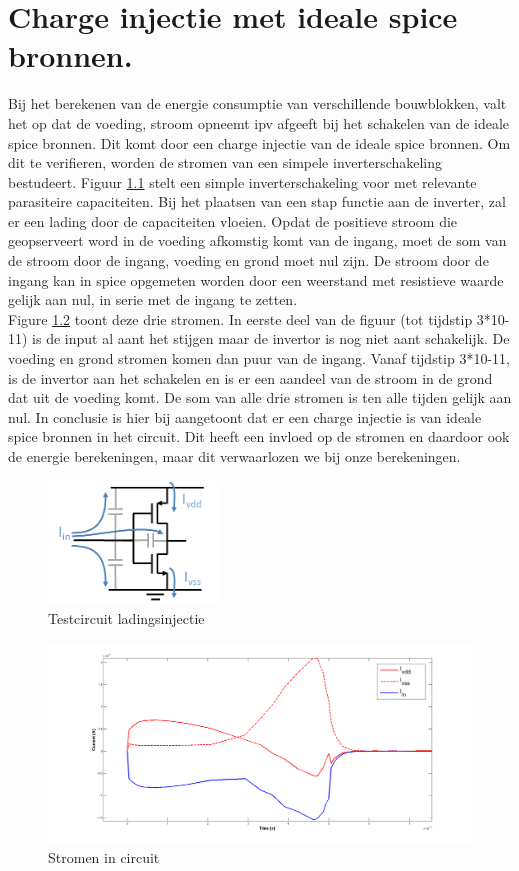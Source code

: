 \chapter{Charge injectie met ideale spice bronnen.}
\label{app:chargeinj}
Bij het berekenen van de energie consumptie van verschillende bouwblokken, valt het op dat de voeding, stroom opneemt ipv afgeeft bij het schakelen van de ideale spice bronnen. Dit komt door een charge injectie van de ideale spice bronnen. Om dit te verifieren, worden de stromen van een simpele inverterschakeling bestudeert. Figuur \ref{fig:chargeinj_inv} stelt een simple inverterschakeling voor met relevante parasiteire capaciteiten. Bij het plaatsen van een stap functie aan de inverter, zal er een lading door de capaciteiten vloeien. Opdat de positieve stroom die geopserveert word in de voeding afkomstig komt van de ingang, moet de som van de stroom door de ingang, voeding en grond moet nul zijn. De stroom door de ingang kan in spice opgemeten worden door een weerstand met resistieve waarde gelijk aan nul, in serie met de ingang te zetten.\\
Figure \ref{fig:chargeinj_cur} toont deze drie stromen. In eerste deel van de figuur (tot tijdstip 3*10-11) is de input al aant het stijgen maar de invertor is nog niet aant schakelijk. De voeding en grond stromen komen dan puur van de ingang. Vanaf tijdstip 3*10-11, is de invertor aan het schakelen en is er een aandeel van de stroom in de grond dat uit de voeding komt. De som van alle drie stromen is ten alle tijden gelijk aan nul.
In conclusie is hier bij aangetoont dat er een charge injectie is van ideale spice bronnen in het circuit. Dit heeft een invloed op de stromen en daardoor ook de energie berekeningen, maar dit verwaarlozen we bij onze berekeningen.

\begin{figure}[!ht]
  \centering
  \includegraphics[width=0.4\textwidth]{../fig/hfdst-chargeinj-inv.png}
  \caption{Testcircuit ladingsinjectie}
  \label{fig:chargeinj_inv}
\end{figure}

\begin{figure}[!ht]
  \centering
  \includegraphics[width=\textwidth]{../fig/hfdst-chargeinj-currents.png}
  \caption{Stromen in circuit}
  \label{fig:chargeinj_cur}
\end{figure}